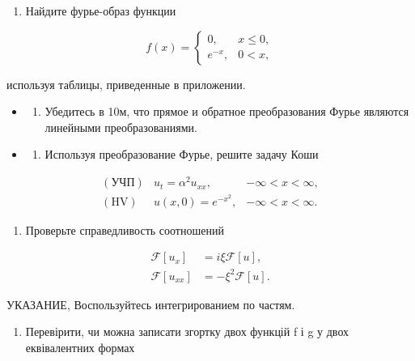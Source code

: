 \documentclass[
  ukrainian,
]{article}
\providecommand{\tightlist}{%
  \setlength{\itemsep}{0pt}\setlength{\parskip}{0pt}}
\begin{document}
\begin{enumerate}
\def\labelenumi{\arabic{enumi}.}
\tightlist
\item
  Найдите фурье-образ функции
\end{enumerate}

\[
f(x) =
\begin{cases} 0, & x \leq 0, \\ e^{-x}, & 0 < x, \end{cases}
\]

используя таблицы, приведенные в приложении.

\begin{itemize}
\tightlist
\item
  \begin{enumerate}
  \def\labelenumi{\arabic{enumi}.}
  \setcounter{enumi}{1}
  \tightlist
  \item
    Убедитесь в 10м, что прямое и обратное преобразования Фурье являются
    линейными преобразованиями.
  \end{enumerate}
\item
  \begin{enumerate}
  \def\labelenumi{\arabic{enumi}.}
  \setcounter{enumi}{2}
  \tightlist
  \item
    Используя преобразование Фурье, решите задачу Коши
  \end{enumerate}
\end{itemize}

\[
\begin{array}{lll} (\text{УЧП}) & u_t = \alpha^2 u_{xx}, & -\infty < x < \infty, \\ (\text{HV}) & u(x, 0) = e^{-x^2}, & -\infty < x < \infty. \end{array}
\]

\begin{enumerate}
\def\labelenumi{\arabic{enumi}.}
\setcounter{enumi}{3}
\tightlist
\item
  Проверьте справедливость соотношений
\end{enumerate}

\[
\begin{aligned} \mathcal{F}\left[u_{x}\right] &= i\xi \mathcal{F}\left[u\right], \\ \mathcal{F}\left[u_{xx}\right] &= -\xi^{2} \mathcal{F}\left[u\right]. \end{aligned}
\]

УКАЗАНИЕ, Воспользуйтесь интегрированием по частям.

\begin{enumerate}
\def\labelenumi{\arabic{enumi}.}
\setcounter{enumi}{4}
\tightlist
\item
  Перевірити, чи можна записати згортку двох функцій f і g у двох
  еквівалентних формах
\end{enumerate}
\end{document}
